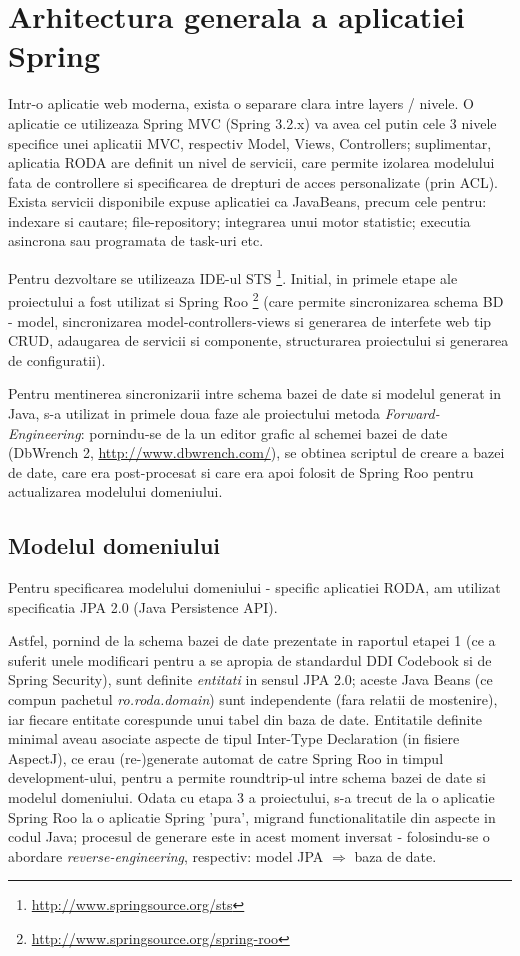 \section{Arhitectura generala a aplicatiei Spring}

Intr-o aplicatie web moderna, exista o separare clara intre layers /
nivele. O aplicatie ce utilizeaza Spring MVC (Spring 3.2.x) va avea cel putin
cele 3 nivele specifice unei aplicatii MVC, respectiv Model, Views, Controllers; 
suplimentar, aplicatia RODA are definit un nivel de servicii, 
care permite izolarea modelului fata de controllere si specificarea de drepturi de acces personalizate (prin ACL). 
Exista servicii disponibile expuse aplicatiei ca JavaBeans, precum cele pentru: 
indexare si cautare; file-repository; 
integrarea unui motor statistic; 
executia asincrona sau programata de task-uri etc.


Pentru dezvoltare se utilizeaza IDE-ul STS
\footnote{\url{http://www.springsource.org/sts}}.
Initial, in primele etape ale proiectului a fost utilizat si Spring Roo
\footnote{\url{http://www.springsource.org/spring-roo}}
(care permite sincronizarea schema BD - model, sincronizarea model-controllers-views si generarea de
interfete web tip CRUD, adaugarea de servicii si componente, structurarea proiectului si generarea de configuratii).

Pentru mentinerea sincronizarii intre schema bazei de date si modelul generat
in Java, s-a utilizat in primele doua faze ale proiectului metoda \emph{Forward-Engineering}: 
pornindu-se de la un editor grafic al schemei bazei de date (DbWrench 2, \url{http://www.dbwrench.com/}),
se obtinea scriptul de creare a bazei de date, 
care era post-procesat si care era apoi folosit de Spring Roo pentru
actualizarea modelului domeniului.

\subsection{Modelul domeniului}
Pentru specificarea modelului domeniului - specific aplicatiei RODA, 
am utilizat specificatia JPA 2.0 (Java Persistence API).

Astfel, pornind de la schema bazei de date prezentate in raportul etapei 1 (ce
a suferit unele modificari pentru a se apropia de standardul DDI Codebook si
de Spring Security), sunt definite \emph{entitati} in sensul JPA 2.0; 
aceste Java Beans (ce compun pachetul \emph{ro.roda.domain}) 
sunt independente (fara relatii de mostenire),
iar fiecare entitate corespunde unui tabel din baza de date. 
Entitatile definite minimal aveau asociate 
aspecte de tipul Inter-Type Declaration (in fisiere AspectJ), 
ce erau (re-)generate automat de catre Spring Roo in timpul development-ului, 
pentru a permite roundtrip-ul intre schema bazei de date si modelul domeniului.
Odata cu etapa 3 a proiectului, s-a trecut de la o aplicatie Spring Roo 
la o aplicatie Spring 'pura', 
migrand functionalitatile din aspecte in codul Java; 
procesul de generare este in acest moment inversat - 
folosindu-se o abordare \emph{reverse-engineering}, respectiv: model JPA $\Rightarrow$ baza de date. 

